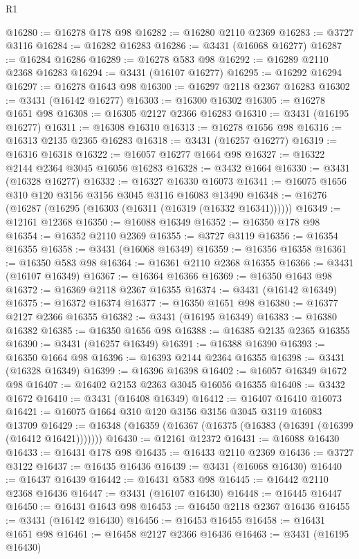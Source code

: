 \begin{lexlean}{R1}
\begin{coremodule}
@16280 := @16278 @178 @98
@16282 := @16280 @2110 @2369
@16283 := @3727 @3116
@16284 := @16282 @16283
@16286 := @3431 (@16068 @16277)
@16287 := @16284 @16286
@16289 := @16278 @583 @98
@16292 := @16289 @2110 @2368 @16283
@16294 := @3431 (@16107 @16277)
@16295 := @16292 @16294
@16297 := @16278 @1643 @98
@16300 := @16297 @2118 @2367 @16283
@16302 := @3431 (@16142 @16277)
@16303 := @16300 @16302
@16305 := @16278 @1651 @98
@16308 := @16305 @2127 @2366 @16283
@16310 := @3431 (@16195 @16277)
@16311 := @16308 @16310
@16313 := @16278 @1656 @98
@16316 := @16313 @2135 @2365 @16283
@16318 := @3431 (@16257 @16277)
@16319 := @16316 @16318
@16322 := @16057 @16277 @1664 @98
@16327 := @16322 @2144 @2364 @3045 @16056 @16283
@16328 := @3432 @1664
@16330 := @3431 (@16328 @16277)
@16332 := @16327 @16330 @16073
@16341 := @16075 @1656 @310 @120 @3156 @3156 @3045 @3116 @16083 @13490
@16348 := @16276 (@16287 (@16295 (@16303 (@16311 (@16319 (@16332 @16341))))))
@16349 := @12161 @12368
@16350 := @16088 @16349
@16352 := @16350 @178 @98
@16354 := @16352 @2110 @2369
@16355 := @3727 @3119
@16356 := @16354 @16355
@16358 := @3431 (@16068 @16349)
@16359 := @16356 @16358
@16361 := @16350 @583 @98
@16364 := @16361 @2110 @2368 @16355
@16366 := @3431 (@16107 @16349)
@16367 := @16364 @16366
@16369 := @16350 @1643 @98
@16372 := @16369 @2118 @2367 @16355
@16374 := @3431 (@16142 @16349)
@16375 := @16372 @16374
@16377 := @16350 @1651 @98
@16380 := @16377 @2127 @2366 @16355
@16382 := @3431 (@16195 @16349)
@16383 := @16380 @16382
@16385 := @16350 @1656 @98
@16388 := @16385 @2135 @2365 @16355
@16390 := @3431 (@16257 @16349)
@16391 := @16388 @16390
@16393 := @16350 @1664 @98
@16396 := @16393 @2144 @2364 @16355
@16398 := @3431 (@16328 @16349)
@16399 := @16396 @16398
@16402 := @16057 @16349 @1672 @98
@16407 := @16402 @2153 @2363 @3045 @16056 @16355
@16408 := @3432 @1672
@16410 := @3431 (@16408 @16349)
@16412 := @16407 @16410 @16073
@16421 := @16075 @1664 @310 @120 @3156 @3156 @3045 @3119 @16083 @13709
@16429 := @16348 (@16359 (@16367 (@16375 (@16383 (@16391 (@16399 (@16412 @16421)))))))
@16430 := @12161 @12372
@16431 := @16088 @16430
@16433 := @16431 @178 @98
@16435 := @16433 @2110 @2369
@16436 := @3727 @3122
@16437 := @16435 @16436
@16439 := @3431 (@16068 @16430)
@16440 := @16437 @16439
@16442 := @16431 @583 @98
@16445 := @16442 @2110 @2368 @16436
@16447 := @3431 (@16107 @16430)
@16448 := @16445 @16447
@16450 := @16431 @1643 @98
@16453 := @16450 @2118 @2367 @16436
@16455 := @3431 (@16142 @16430)
@16456 := @16453 @16455
@16458 := @16431 @1651 @98
@16461 := @16458 @2127 @2366 @16436
@16463 := @3431 (@16195 @16430)

\end{coremodule}
\end{lexlean}

